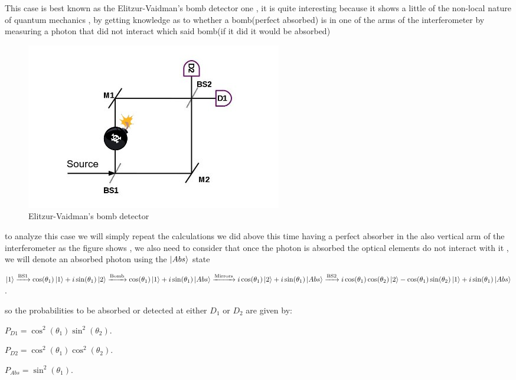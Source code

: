 \documentclass[11pt]{article}
\begin{document}
This case is best known as the Elitzur-Vaidman's bomb detector one\cite{Elitzur} , it is quite interesting because it shows a little of the non-local nature of quantum mechanics , by getting knowledge as to whether a bomb(perfect absorbed) is in one of the arms of the interferometer by measuring a photon that did not interact which said bomb(if it did it would be absorbed)
\
 \begin{figure}[h!]
\centering
\includegraphics[width=\linewidth]{machzenhderbomb.jpg}
\caption{Elitzur-Vaidman's bomb detector}
\label{fig:BS2}
\end{figure}

to analyze this case we will simply repeat the calculations we did above this time having a perfect absorber in the also vertical arm of the interferometer as the figure shows , we also need to consider that once the photon is absorbed the optical elements do not interact with it , we will denote an absorbed photon using the $\ket{Abs}$ state
  
$\ket{1}\xrightarrow{\text{BS1}}\cos(\theta_{1})\ket{1}+i\sin(\theta_{1})\ket{2}\xrightarrow{\text{Bomb}}\cos(\theta_{1})\ket{1}+i\sin(\theta_{1})\ket{Abs}\xrightarrow{\text{Mirrors}}i\cos(\theta_{1})\ket{2}+i\sin(\theta_{1})\ket{Abs}\xrightarrow{\text{BS2}}i\cos(\theta_{1})\cos(\theta_{2})\ket{2}-\cos(\theta_{1})\sin(\theta_{2})\ket{1}+i\sin(\theta_{1})\ket{Abs}$.

so the probabilities to be absorbed or detected at either $D_{1}$ or $D_{2}$ are given by:

$P_{D1}=\cos^2(\theta_{1}) \sin^2(\theta_{2}) $.

$P_{D2}=\cos^2(\theta_{1}) \cos^2(\theta_{2})$.

$P_{Abs}=\sin^2(\theta_{1})$.
\end{document}
